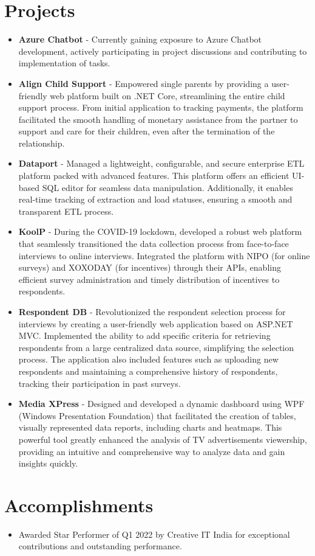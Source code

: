 \documentclass[letterpaper,11pt]{article}
\newcommand{\resumeItem}[2]{
  \item\small{
    \textbf{#1}{ #2 \vspace{-2pt}}
  }
}
\newcommand{\resumeSubItem}[2]{\resumeItem{#1}{#2}\vspace{-4pt}}
\newcommand{\resumeSubHeadingListStart}{\begin{itemize}[leftmargin=*]}
\newcommand{\resumeSubHeadingListEnd}{\end{itemize}}
\begin{document}
\section{Projects}
  \resumeSubHeadingListStart
    \resumeSubItem{Azure Chatbot}
    { - Currently gaining exposure to Azure Chatbot development, actively participating in project discussions and contributing to implementation of tasks. }
    \resumeSubItem{Align Child Support}
    { - Empowered single parents by providing a user-friendly web platform built on .NET Core, streamlining the entire child support process. From initial application to tracking payments, the platform facilitated the smooth handling of monetary assistance from the partner to support and care for their children, even after the termination of the relationship. }
    \resumeSubItem{Dataport}
    { - Managed a lightweight, configurable, and secure enterprise ETL platform packed with advanced features. This platform offers an efficient UI-based SQL editor for seamless data manipulation. Additionally, it enables real-time tracking of extraction and load statuses, ensuring a smooth and transparent ETL process.}
    \resumeSubItem{KoolP}
    { - During the COVID-19 lockdown, developed a robust web platform that seamlessly transitioned the data collection process from face-to-face interviews to online interviews. Integrated the platform with NIPO (for online surveys) and XOXODAY (for incentives) through their APIs, enabling efficient survey administration and timely distribution of incentives to respondents.}
    \resumeSubItem{Respondent DB}
    { - Revolutionized the respondent selection process for interviews by creating a user-friendly web application based on ASP.NET MVC. Implemented the ability to add specific criteria for retrieving respondents from a large centralized data source, simplifying the selection process. The application also included features such as uploading new respondents and maintaining a comprehensive history of respondents, tracking their participation in past surveys.}
    \resumeSubItem{Media XPress}
    { - Designed and developed a dynamic dashboard using WPF (Windows Presentation Foundation) that facilitated the creation of tables, visually represented data reports, including charts and heatmaps. This powerful tool greatly enhanced the analysis of TV advertisements viewership, providing an intuitive and comprehensive way to analyze data and gain insights quickly.}
  \resumeSubHeadingListEnd

\section{Accomplishments}
 \resumeSubHeadingListStart
 \resumeSubItem{}
    {Awarded Star Performer of Q1 2022 by Creative IT India for exceptional contributions and outstanding performance.}
 \resumeSubHeadingListEnd
 
\end{document}

